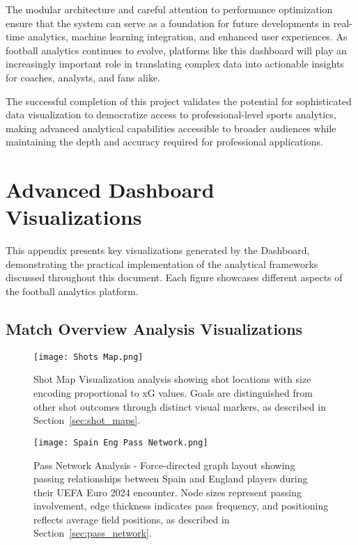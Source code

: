 \documentclass[12pt,a4paper]{article}
\begin{document}
The modular architecture and careful attention to performance optimization ensure that the system can serve as a foundation for future developments in real-time analytics, machine learning integration, and enhanced user experiences. As football analytics continues to evolve, platforms like this dashboard will play an increasingly important role in translating complex data into actionable insights for coaches, analysts, and fans alike.

The successful completion of this project validates the potential for sophisticated data visualization to democratize access to professional-level sports analytics, making advanced analytical capabilities accessible to broader audiences while maintaining the depth and accuracy required for professional applications.

\newpage
\appendix
\section{Advanced Dashboard Visualizations}

This appendix presents key visualizations generated by the Dashboard, demonstrating the practical implementation of the analytical frameworks discussed throughout this document. Each figure showcases different aspects of the football analytics platform.

\subsection{Match Overview Analysis Visualizations}
\begin{figure}[H]
    \centering
    \texttt{[image: Shots Map.png]}
    \caption{Shot Map Visualization analysis showing shot locations with size encoding proportional to xG values. Goals are distinguished from other shot outcomes through distinct visual markers, as described in Section~\ref{sec:shot_maps}.}
    \label{fig:shot_map}
\end{figure}
\begin{figure}[H]
    \centering
    \texttt{[image: Spain Eng Pass Network.png]}
    \caption{Pass Network Analysis - Force-directed graph layout showing passing relationships between Spain and England players during their UEFA Euro 2024 encounter. Node sizes represent passing involvement, edge thickness indicates pass frequency, and positioning reflects average field positions, as described in Section~\ref{sec:pass_network}.}
    \label{fig:pass_network}
\end{figure}
\end{document}
